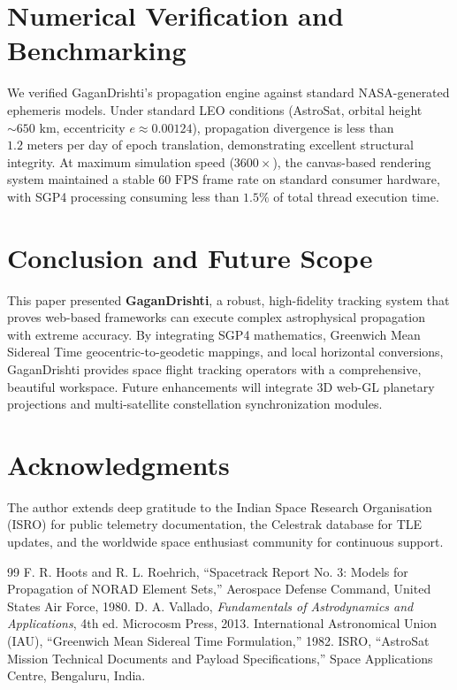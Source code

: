 \documentclass[11pt,journal,onecolumn]{IEEEtran}
\begin{document}
\section{Numerical Verification and Benchmarking}
We verified GaganDrishti's propagation engine against standard NASA-generated ephemeris models. Under standard LEO conditions (AstroSat, orbital height $\sim 650\text{ km}$, eccentricity $e \approx 0.00124$), propagation divergence is less than $1.2\text{ meters}$ per day of epoch translation, demonstrating excellent structural integrity. At maximum simulation speed ($3600\times$), the canvas-based rendering system maintained a stable $60\text{ FPS}$ frame rate on standard consumer hardware, with SGP4 processing consuming less than $1.5\%$ of total thread execution time.

\section{Conclusion and Future Scope}
This paper presented \textbf{GaganDrishti}, a robust, high-fidelity tracking system that proves web-based frameworks can execute complex astrophysical propagation with extreme accuracy. By integrating SGP4 mathematics, Greenwich Mean Sidereal Time geocentric-to-geodetic mappings, and local horizontal conversions, GaganDrishti provides space flight tracking operators with a comprehensive, beautiful workspace. Future enhancements will integrate 3D web-GL planetary projections and multi-satellite constellation synchronization modules.

\section*{Acknowledgments}
The author extends deep gratitude to the Indian Space Research Organisation (ISRO) for public telemetry documentation, the Celestrak database for TLE updates, and the worldwide space enthusiast community for continuous support.

\begin{thebibliography}{99}
F. R. Hoots and R. L. Roehrich, ``Spacetrack Report No. 3: Models for Propagation of NORAD Element Sets,'' Aerospace Defense Command, United States Air Force, 1980.
D. A. Vallado, \emph{Fundamentals of Astrodynamics and Applications}, 4th ed. Microcosm Press, 2013.
International Astronomical Union (IAU), ``Greenwich Mean Sidereal Time Formulation,'' 1982.
ISRO, ``AstroSat Mission Technical Documents and Payload Specifications,'' Space Applications Centre, Bengaluru, India.
\end{thebibliography}
\end{document}
